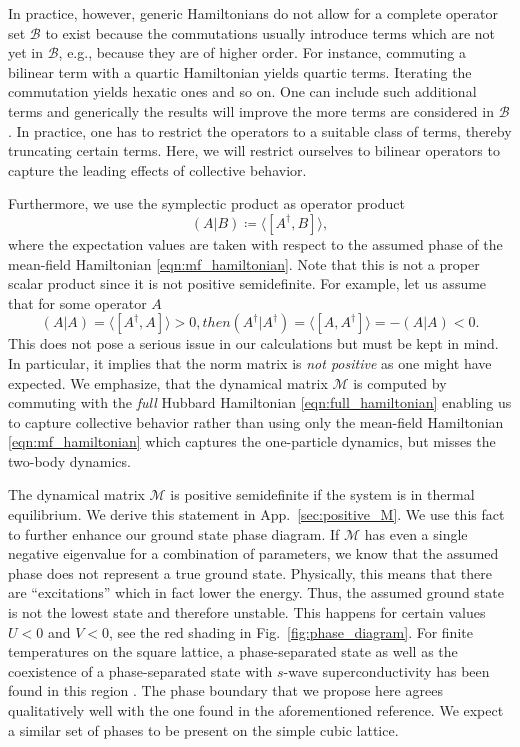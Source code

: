 \documentclass[
    reprint, 
    aps,
    preprintnumbers,
    twocolumn,
    prb,
    superscriptaddress
]{revtex4-2}
\newcommand{\mM}{\mathcal{M}}
\newcommand{\bs}{\begin{subequations}}
\newcommand{\es}{\end{subequations}}
\begin{document}
In practice, however, generic Hamiltonians do not allow for
a complete operator set $\mathcal{B}$ to exist because the commutations usually introduce terms which are not 
yet in $\mathcal{B}$, e.g., because they are of higher order.
For instance, commuting a bilinear term with a quartic Hamiltonian yields quartic terms. 
Iterating the commutation yields hexatic ones and so on.
One can include such additional terms and generically the results will improve the more
terms are considered in $\mathcal{B}$. In practice, one has to restrict the operators
to a suitable class of terms, thereby truncating certain terms. Here, we will restrict ourselves
to bilinear operators to capture the leading effects of collective behavior.

Furthermore, we use the symplectic product as operator product
\begin{equation}
\label{eqn:scalar_product}
    (A | B) \coloneqq  \langle [A^\dagger, B] \rangle,
\end{equation}
where the expectation values are taken with respect to the assumed phase of the mean-field Hamiltonian 
\eqref{eqn:mf_hamiltonian}.
Note that this is not a proper scalar product since it is not positive semidefinite.
For example, let us assume that for some operator $A$
\bs
\begin{equation}
(A | A) = \langle [A^\dagger, A] \rangle > 0,
\end{equation}
then
\begin{equation}
(A^\dagger | A^\dagger) = \langle [A, A^\dagger] \rangle = - (A | A)  < 0.
\end{equation}
\es
This does not pose a serious issue in our calculations but must be kept in mind.
In particular, it implies that the norm matrix is \emph{not positive} as one might have expected.
We emphasize, that the dynamical matrix  $\mM$ is computed
by commuting with the \emph{full} Hubbard Hamiltonian \eqref{eqn:full_hamiltonian} 
enabling us to capture collective behavior 
rather than using only the mean-field Hamiltonian \eqref{eqn:mf_hamiltonian}
which captures the one-particle dynamics, but misses the two-body dynamics.

The dynamical matrix $\mM$ is positive semidefinite if the system is in thermal equilibrium.
We derive this statement in  App.\ \ref{sec:positive_M}.
We use this fact to further enhance our ground state phase diagram.
If $\mM$ has even a single negative eigenvalue for a combination of parameters, 
we know that the assumed phase does not represent a true ground state.
Physically, this means that there are ``excitations'' which in fact lower the energy. 
Thus, the assumed ground state is not the lowest state and therefore unstable.
This happens for certain values $U<0$ and $V<0$, see the red shading in Fig.\ \ref{fig:phase_diagram}.
For finite temperatures on the square lattice, a phase-separated state as well as the coexistence of a phase-separated state with $s$-wave superconductivity has been found in this region \cite{Linner23}.
The phase boundary that we propose here agrees qualitatively well with the one found in the aforementioned reference.
We expect a similar set of phases to be present on the simple cubic lattice. 
\end{document}
